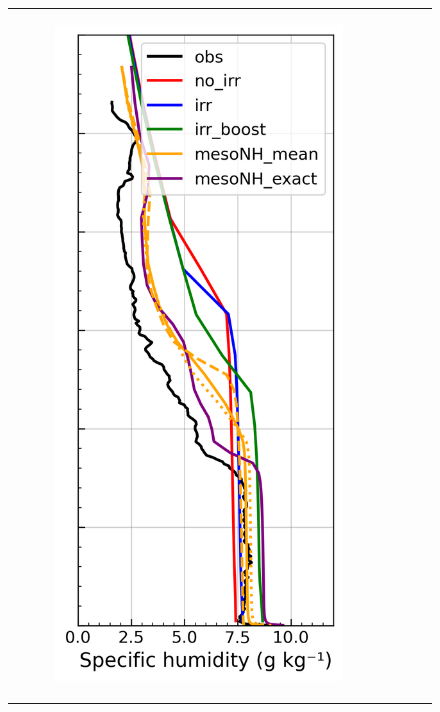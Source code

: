 \begin{figure}[hbtp]
{\begin{tabular}{@{}cccc@{}}
\begin{subfigure}[t]{0.29\textwidth}
            \caption{}
            \includegraphics[width=\textwidth]{images/chap5/profiles/profile_cendrosa_ovap_1507_sensbins.png}

\end{subfigure}
\end{tabular}}
\end{figure}

